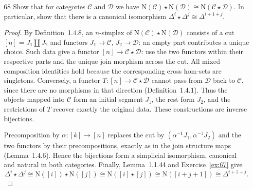 \begin{exercise}{68}
Show that for categories $\mathcal C$ and $\mathcal D$ we have $\mathrm N(\mathcal C)\star\mathrm N(\mathcal D)\cong\mathrm N(\mathcal C\star\mathcal D)$. In particular, show that there is a canonical isomorphism $\Delta^i\star\Delta^j\cong\Delta^{i+1+j}$.

\begin{proof}
By Definition~1.4.8, an $n$-simplex of
$\mathrm N(\mathcal C)\star\mathrm N(\mathcal D)$
consists of a cut $[n]=J_1\amalg J_2$ and functors
$J_1\to\mathcal C$, $J_2\to\mathcal D$;
an empty part contributes a unique choice.
Such data give a functor $[n]\to\mathcal C\star\mathcal D$:
use the two functors within their respective parts and
the unique join morphism across the cut.
All mixed composition identities hold because the
corresponding cross hom-sets are singletons.
Conversely, a functor $T\colon[n]\to\mathcal C\star\mathcal D$
cannot pass from $\mathcal D$ back to $\mathcal C$, since
there are no morphisms in that direction
(Definition~1.4.1).
Thus the objects mapped into $\mathcal C$ form an initial
segment $J_1$, the rest form $J_2$, and the restrictions
of $T$ recover exactly the original data.
These constructions are inverse bijections.

Precomposition by $\alpha\colon[k]\to[n]$ replaces the
cut by $(\alpha^{-1}J_1,\alpha^{-1}J_2)$ and the two
functors by their precompositions, exactly as in the
join structure maps (Lemma~1.4.6).
Hence the bijections form a simplicial isomorphism,
canonical and natural in both categories.
Finally, Lemma~1.1.44 and Exercise~\ref{ex:67} give
\[
 \Delta^i\star\Delta^j
 \cong\mathrm N([i])\star\mathrm N([j])
 \cong\mathrm N([i]\star[j])
 \cong\mathrm N([i+j+1])
 \cong\Delta^{i+1+j}.
\]
\end{proof}
\end{exercise}
